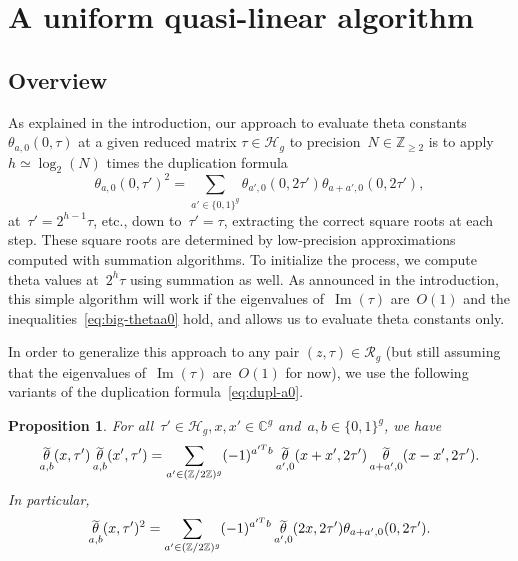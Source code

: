 \documentclass[12pt,oneside]{amsart}
\numberwithin{equation}{section}
\newtheorem{prop}[equation]{Proposition}
\theoremstyle{definition}
\newcommand{\Z}{\mathbb{Z}}
\newcommand{\red}{\mathcal{R}}
\newcommand{\C}{\mathbb{C}}
\newcommand{\Half}{\mathcal{H}}
\DeclareMathOperator{\im}{Im}
\DeclareMathOperator{\thetatilde}{\rlap{\raisebox{-0.1ex}{$\widetilde{\phantom{\,t}}$}}\theta}
\begin{document}
\section{A uniform quasi-linear algorithm}
\label{sec:ql}

\subsection{Overview}
\label{subsec:dupl}

As explained in the introduction, our approach to evaluate theta constants
$\theta_{a,0}(0,\tau)$ at a given reduced matrix $\tau\in \Half_g$ to
precision~$N\in \Z_{\geq 2}$ is to apply $h\simeq \log_2(N)$ times the
duplication formula
\begin{equation}
  \label{eq:dupl-a0}
  \theta_{a,0}(0,\tau')^2 = \sum_{a'\in \{0,1\}^g} \theta_{a',0}(0,2\tau')\theta_{a+a',0}(0,2\tau'),
\end{equation}
at~$\tau' = 2^{h-1}\tau$, etc., down to~$\tau' = \tau$, extracting the correct
square roots at each step. These square roots are determined by low-precision
approximations computed with summation algorithms. To initialize the process,
we compute theta values at~$2^h\tau$ using summation as well. As announced in
the introduction, this simple algorithm will work if the eigenvalues
of~$\im(\tau)$ are~$O(1)$ and the inequalities~\eqref{eq:big-thetaa0} hold, and
allows us to evaluate theta constants only.

In order to generalize this approach to any pair $(z,\tau)\in \red_g$ (but
still assuming that the eigenvalues of~$\im(\tau)$ are~$O(1)$ for now), we use
the following variants of the duplication formula~\eqref{eq:dupl-a0}.

\begin{prop}
  \label{prop:dupl-gen}
  For all~$\tau'\in \Half_g, x, x'\in \C^g$ and~$a,b\in\{0,1\}^g$, we have
  \begin{equation}
    \label{eq:dupl-z-zp}
    \thetatilde_{a,b}(x,\tau') \thetatilde_{a,b}(x',\tau')
    = \sum_{a'\in(\Z/2\Z)^g} (-1)^{a'^T b} \thetatilde_{a',0}(x+x',2\tau') \thetatilde_{a+a',0}(x-x',2\tau').
  \end{equation}
  In particular,
  \begin{equation}
    \label{eq:dupl-z}
    \thetatilde_{a,b}(x,\tau')^2 = \sum_{a'\in (\Z/2\Z)^g} (-1)^{a'^T b} \thetatilde_{a',0}(2x,2\tau') \theta_{a+a',0}(0,2\tau').
  \end{equation}
\end{prop}
\end{document}
